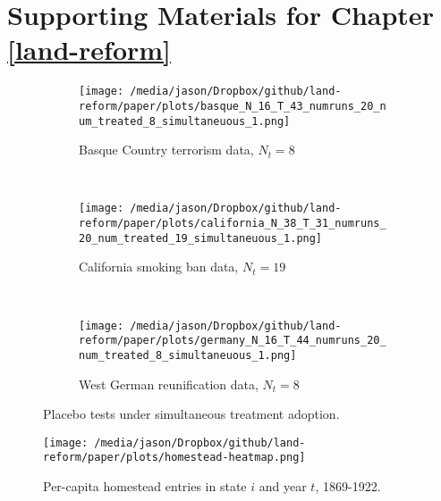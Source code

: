 \chapter{Supporting Materials for Chapter \ref{land-reform}}

\begin{figure}[htbp]
	\centering
	\begin{subfigure}[t]{0.48\textwidth}
		\centering
		\texttt{[image: /media/jason/Dropbox/github/land-reform/paper/plots/basque\_N\_16\_T\_43\_numruns\_20\_num\_treated\_8\_simultaneuous\_1.png]}
		\caption{Basque Country terrorism data, $N_t = 8$} 
	\end{subfigure}
	~ 
	\begin{subfigure}[t]{0.48\textwidth}
		\centering
		\texttt{[image: /media/jason/Dropbox/github/land-reform/paper/plots/california\_N\_38\_T\_31\_numruns\_20\_num\_treated\_19\_simultaneuous\_1.png]}
		\caption{California smoking ban data, $N_t = 19$}
	\end{subfigure}
	~
	\begin{subfigure}[t]{0.48\textwidth}
		\centering
		\texttt{[image: /media/jason/Dropbox/github/land-reform/paper/plots/germany\_N\_16\_T\_44\_numruns\_20\_num\_treated\_8\_simultaneuous\_1.png]}
		\caption{West German reunification data, $N_t = 8$} 
	\end{subfigure}
	\caption{Placebo tests under simultaneous treatment adoption. \label{synth-sim}} 
\end{figure}

\begin{figure}[htbp]
	\begin{center}
		\texttt{[image: /media/jason/Dropbox/github/land-reform/paper/plots/homestead-heatmap.png]}
	\end{center}
	\caption{Per-capita homestead entries in state $i$ and year $t$, 1869-1922. \label{fig:homestead-heatmap}}
\end{figure}

